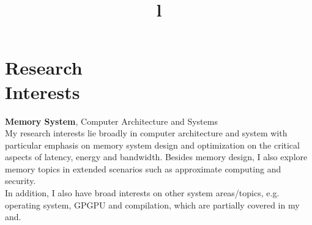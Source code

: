


\topmargin 0.1in									%


\address{
\Mobilefone \ +1 412-425-4362 \ \  {\large \WritingHand} 6514 Sennott Square, Pittsburgh PA-15206
}

\begin{resume}

\vspace{-6mm}
\section{\mysidestyle Research\\ Interests}
\textbf{Memory System}, Computer Architecture and Systems\\
My research interests lie broadly in computer architecture and system with particular emphasis
on memory system design and optimization on the critical aspects of latency, energy and
bandwidth. Besides memory design, I also explore memory topics in extended scenarios such
as approximate computing and security.\\
In addition, I also have broad interests on other system areas/topics, e.g. operating system,
GPGPU and compilation, which are partially covered in my and.


\section{}

\newcommand{\university}{\organization}			%
\newcommand{\degree}{\title}					%
\begin{formatb}
  \degree{l}\\							%
  \university{l}\\								%
\end{formatb}


\end{resume}
